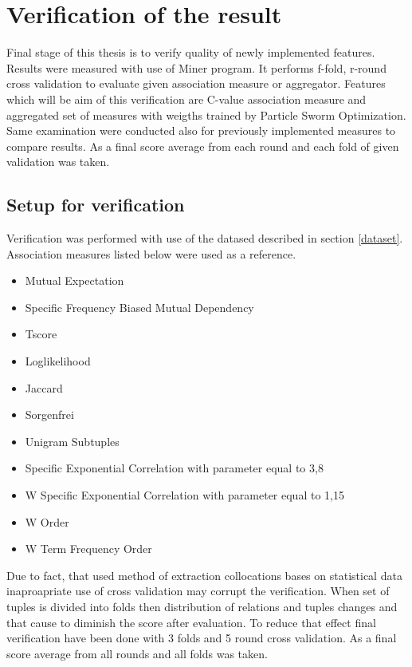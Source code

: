 \chapter{Verification of the result} \label{verification}

Final stage of this thesis is to verify quality of newly implemented features. Results were measured with use of Miner program. 
It performs f-fold, r-round cross validation to evaluate given association measure or aggregator. Features which will be aim of 
this verification are C-value association measure and aggregated set of measures with weigths trained by Particle Sworm Optimization. 
Same examination were conducted also for previously implemented measures to compare results. As a final score average from each round 
and each fold of given validation was taken.

\section{Setup for verification}
Verification was performed with use of the datased described in section \ref{dataset}. Association measures listed below 
were used as a reference.
\begin{itemize}
    \setlength\itemsep{0em}
    \item Mutual Expectation
    \item Specific Frequency Biased Mutual Dependency
    \item Tscore
    \item Loglikelihood
    \item Jaccard
    \item Sorgenfrei
    \item Unigram Subtuples
    \item Specific Exponential Correlation with parameter equal to 3,8
    \item W Specific Exponential Correlation with parameter equal to 1,15
    \item W Order
    \item W Term Frequency Order
\end{itemize}

Due to fact, that used method of extraction collocations bases on statistical data inaproapriate use of cross validation 
may corrupt the verification. When set of tuples is divided into folds then distribution of relations and tuples 
changes and that cause to diminish the score after evaluation. To reduce that effect final verification 
have been done with 3 folds and 5 round cross validation. As a final score average from all rounds and all folds was taken.

